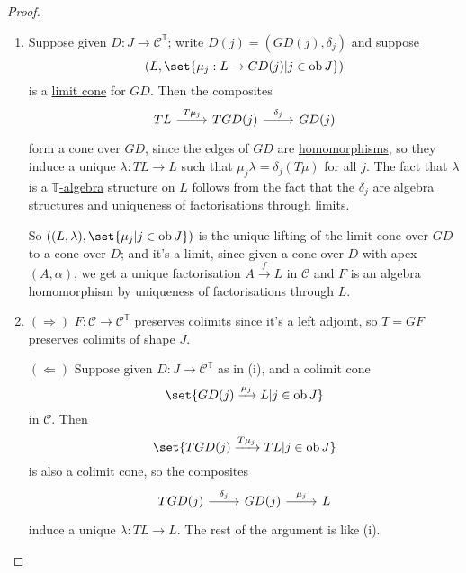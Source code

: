\documentclass{article}
\DeclareMathOperator{\ob}{ob}
\begin{document}
\begin{proof}\leavevmode
  \begin{enumerate}[label=(\roman*)]
    \item Suppose given $D: J \to \mathscr{C}^\mathbb{T}$; write $D(j) = (GD(j), \delta_j)$ and suppose
      \begin{equation*}(L, \set{\mu_j: L \to GD(j) | j \in \ob J})\end{equation*}
      is a \hyperlink{def:limit}{limit cone} for $GD$.
      Then the composites
      \begin{equation*}
        \begin{tikzcd}
          TL \rar{T\mu_j} & TGD(j) \rar{\delta_j} & GD(j)
        \end{tikzcd}
      \end{equation*}
      form a cone over $GD$, since the edges of $GD$ are \hyperlink{def:em}{homomorphisms}, so they induce a unique $\lambda: TL \to L$ such that $\mu_j \lambda = \delta_j(T\mu)$ for all $j$.
      The fact that $\lambda$ is a \hyperlink{def:em}{$\mathbb{T}$-algebra} structure on $L$ follows from the fact that the $\delta_j$ are algebra structures and uniqueness of factorisations through limits.

      So $((L,\lambda), \set{\mu_j | j \in \ob J})$ is the unique lifting of the limit cone over $GD$ to a cone over $D$; and it's a limit, since given a cone over $D$ with apex $(A, \alpha)$, we get a unique factorisation $A \xrightarrow{f} L$ in $\mathscr{C}$ and $F$ is an algebra homomorphism by uniqueness of factorisations through $L$.

    \item $(\Rightarrow)$ $F: \mathscr{C} \to \mathscr{C}^\mathbb{T}$ \hyperlink{def:plim}{preserves colimits} since it's a \hyperlink{def:adj}{left adjoint}, so $T = GF$ preserves colimits of shape $J$.

      $(\Leftarrow)$ Suppose given $D: J \to \mathscr{C}^\mathbb{T}$ as in (i), and a colimit cone
      \begin{equation*}
        \set{GD(j) \xrightarrow{\mu_j} L | j \in \ob J}
      \end{equation*}
      in $\mathscr{C}$.
      Then
      \begin{equation*}
        \set{TGD(j) \xrightarrow{T\mu_j} TL | j \in \ob J}
      \end{equation*}
      is also a colimit cone, so the composites
      \begin{equation*}
        \begin{tikzcd}
          TGD(j) \rar{\delta_j} & GD(j) \rar{\mu_j}& L
        \end{tikzcd}
      \end{equation*}
      induce a unique $\lambda: TL \to L$.
      The rest of the argument is like (i). \qedhere
  \end{enumerate}
\end{proof}
\end{document}
